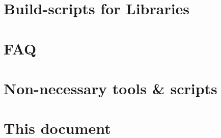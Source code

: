 % 
%               
%          
% 

\begin{appendices}

\chapter{Build-scripts for Libraries}
\label{sec:Appendix:BuildScripts}
\setcounter{currentlevel}{6}


\chapter{FAQ}
\setcounter{currentlevel}{6}


% 

\chapter{Non-necessary tools \& scripts}
\setcounter{currentlevel}{6}


\chapter{This document}
\setcounter{currentlevel}{6}


\end{appendices}


